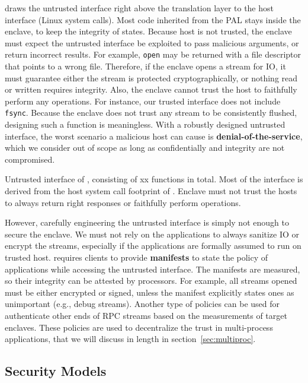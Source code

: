 \sysname{} draws the untrusted interface right above the translation layer
to the host interface (Linux system calls).
Most code inherited from the \graphene{} PAL stays inside
the enclave, to keep the integrity of states.
Because host is not trusted,
the enclave must expect the untrusted interface be exploited to
pass malicious arguments, or return incorrect results.
For example, {\tt open} may be returned with a file descriptor that points
to a wrong file. Therefore, if the enclave opens a stream for IO,
it must guarantee either the stream is protected cryptographically,
or nothing read or written requires integrity.
Also, the enclave cannot trust the host to faithfully perform any operations.
For instance, our trusted interface does not include {\tt fsync}.
Because the enclave does not trust any stream to be consistently flushed,
designing such a function is meaningless.
With a robustly designed untrusted interface,
the worst scenario a malicious host can cause is {\bf denial-of-the-service},
which we consider out of scope
as long as confidentially and integrity are not compromised.

\begin{table}
\centering

\caption{
Untrusted interface of \sysname{}, consisting of xx functions in total.
Most of the interface is derived from the host system call footprint of
\graphene{} \libos{}. Enclave must not trust the hosts to
always return right responses or faithfully perform operations.
}
\label{tab:interface}
\end{table}

However, carefully engineering the untrusted interface is simply not enough
to secure the enclave.
We must not rely on the applications to always
sanitize IO or encrypt the streams,
especially if the applications are formally assumed to run on trusted host.
\sysname{} requires clients to provide {\bf manifests} to state
the policy of applications while accessing the untrusted interface.
The manifests are measured, so their integrity can be attested by processors.
For example, all streams opened must be either encrypted or signed,
unless the manifest explicitly states ones as unimportant
(e.g., debug streams).
Another type of policies can be used for authenticate other ends of RPC streams
based on the measurements of target enclaves.
These policies are used to decentralize the trust in multi-process applications,
that we will discuss in length in section~\ref{sec:multiproc}.

\subsection{Security Models}
\label{sec:background:security}

